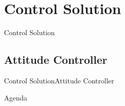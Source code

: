 \section{Control Solution}
\begin{frame}{Control Solution}{}

\end{frame}

\subsection{Attitude Controller}
\begin{frame}{Control Solution}{Attitude Controller}
    
\end{frame}

\begin{frame}{Agenda}{}
    \tableofcontents
\end{frame}

